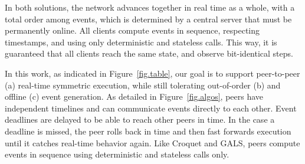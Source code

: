 \documentclass[12pt]{article}
\begin{document}
In both solutions, the network advances together in real time as a whole, with
a total order among events, which is determined by a central server that must
be permanently online.
All clients compute events in sequence, respecting timestamps, and using only
deterministic and stateless calls.
This way, it is guaranteed that all clients reach the same state, and
observe bit-identical steps.

In this work, as indicated in Figure~\ref{fig.table}, our goal is to support
peer-to-peer (a) real-time symmetric execution, while still tolerating
out-of-order (b) and offline (c) event generation.
%
As detailed in Figure~\ref{fig.algos}, peers have independent timelines and
can communicate events directly to each other.
Event deadlines are delayed to be able to reach other peers in time.
In the case a deadline is missed, the peer rolls back in time and then fast
forwards execution until it catches real-time behavior again.
%
Like Croquet and GALS, peers compute events in sequence using deterministic and
stateless calls only.
\end{document}
